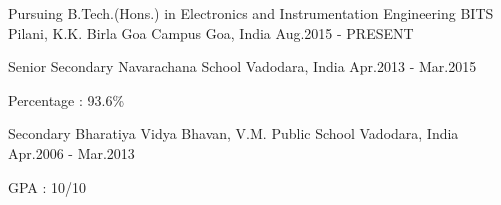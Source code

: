 \begin{cventries}
  \cventry
    {Pursuing B.Tech.(Hons.) in Electronics and Instrumentation Engineering}
    {BITS Pilani, K.K. Birla Goa Campus}
    {Goa, India}
    {Aug.2015 - PRESENT}
    {
    }
    
    \cventry
    {Senior Secondary}
    {Navarachana School}
    {Vadodara, India}
    {Apr.2013 - Mar.2015}
    {
      \begin{cvitems}
        \item {Percentage : 93.6\%}
      \end{cvitems}
    }
    \cventry
    {Secondary}
    {Bharatiya Vidya Bhavan, V.M. Public School}
    {Vadodara, India}
    {Apr.2006 - Mar.2013}
    {
      \begin{cvitems}
        \item {GPA : 10/10}
      \end{cvitems}
    }
\end{cventries}
